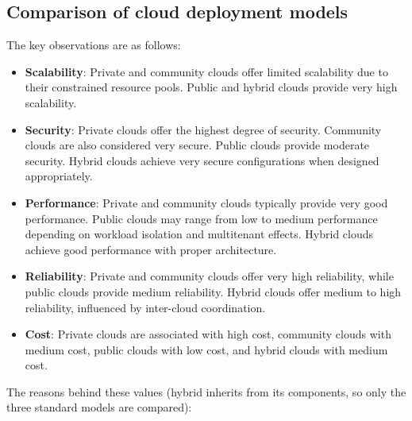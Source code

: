 \begin{center}
\end{center}

\subsection{Comparison of cloud deployment models}

The key observations are as follows:

\begin{itemize}
\item \textbf{Scalability}: Private and community clouds offer limited scalability due to their constrained resource pools. Public and hybrid clouds provide very high scalability.
\item \textbf{Security}: Private clouds offer the highest degree of security. Community clouds are also considered very secure. Public clouds provide moderate security. Hybrid clouds achieve very secure configurations when designed appropriately.
\item \textbf{Performance}: Private and community clouds typically provide very good performance. Public clouds may range from low to medium performance depending on workload isolation and multitenant effects. Hybrid clouds achieve good performance with proper architecture.
\item \textbf{Reliability}: Private and community clouds offer very high reliability, while public clouds provide medium reliability. Hybrid clouds offer medium to high reliability, influenced by inter-cloud coordination.
\item \textbf{Cost}: Private clouds are associated with high cost, community clouds with medium cost, public clouds with low cost, and hybrid clouds with medium cost.
\end{itemize}

\begin{center}
\end{center}

The reasons behind these values (hybrid inherits from its components, so only the three standard models are compared):

